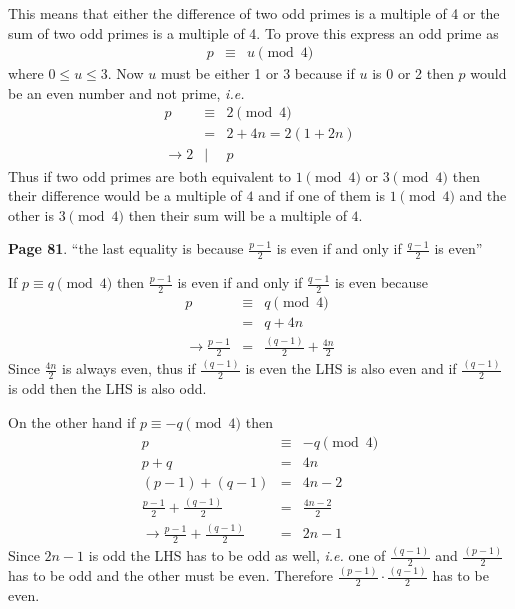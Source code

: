 \documentclass[aps,preprint,preprintnumbers,nofootinbib,showpacs,prd]{revtex4-1}
\newcommand{\ie}{{\it i.e.} }
\newcommand{\nbea}{\begin{eqnarray*}}
\newcommand{\neea}{\end{eqnarray*}}
\begin{document}
This means that either the difference of two odd primes is a multiple of 4 or the sum of two odd primes is a multiple of 4. To prove this express an odd prime as
%
\nbea
p & \equiv & u \pmod{4}
\neea
%
where $0 \le u \le 3$. Now $u$ must be either 1 or 3 because if $u$ is 0 or 2 then $p$ would be an even number and not prime, \ie
%
\nbea
p & \equiv & 2 \pmod{4} \\
& = & 2 + 4n = 2 (1 + 2n) \\
\to 2 & | & p
\neea
%
Thus if two odd primes are both equivalent to $1 \pmod{4}$ or $3 \pmod{4}$ then their difference would be a multiple of $4$ and if one of them is $1 \pmod{4}$ and the other is $3 \pmod{4}$ then their sum will be a multiple of $4$.

{\bf Page 81}. ``the last equality is because $\frac{p−1}{2}$ is even if and only if $\frac{q−1}{2}$ is even''

If $p \equiv q \pmod{4}$ then $\frac{p-1}{2}$ is even if and only if $\frac{q-1}{2}$ is even because
%
\nbea
p & \equiv & q \pmod{4} \\
& = & q + 4n \\
\to \frac{p - 1}{2} & = & \frac{(q-1)}{2} + \frac{4n}{2}
\neea
%
Since $\frac{4n}{2}$ is always even, thus if $\frac{(q-1)}{2}$ is even the LHS is also even and if $\frac{(q-1)}{2}$ is odd then the LHS is also odd.

On the other hand if $p \equiv -q \pmod{4}$ then 
%
\nbea
p & \equiv & -q \pmod{4} \\
p + q & = & 4n \\
(p - 1) + (q - 1) & = & 4n - 2 \\
\frac{p - 1}{2} + \frac{(q-1)}{2} & = & \frac{4n - 2}{2} \\
\to \frac{p - 1}{2} + \frac{(q-1)}{2} & = & 2n - 1
\neea
%
Since $2n - 1$ is odd the LHS has to be odd as well, \ie one of $\frac{(q-1)}{2}$ and $\frac{(p-1)}{2}$ has to be odd and the other must be even. Therefore $\frac{(p-1)}{2} \cdot \frac{(q-1)}{2}$ has to be even. 
\end{document}
